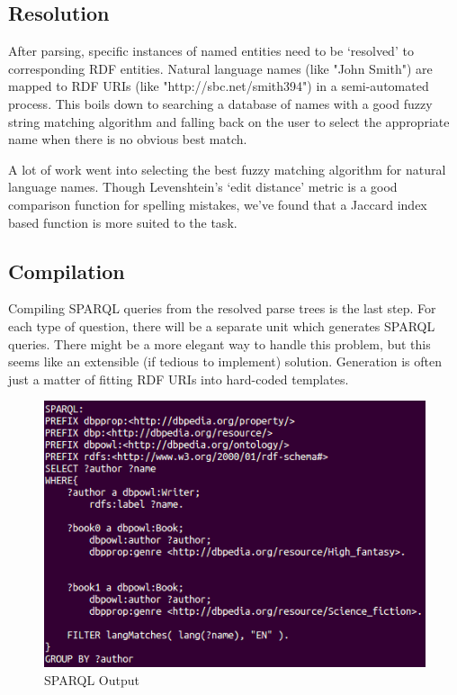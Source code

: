 \documentclass[11pt]{article}
\begin{document}
\subsection{Resolution}
After parsing, specific instances of named entities need to be `resolved' to
corresponding RDF entities. Natural language names (like "John Smith") are mapped
to RDF URIs (like "http://sbc.net/smith394")
in a semi-automated process. This boils down to searching a
database of names with a good fuzzy string matching algorithm and falling
back on the user to select the appropriate name when there is no obvious best 
match.

A lot of work went into selecting the best fuzzy matching algorithm for
natural language names. Though Levenshtein's `edit distance' metric
is a good comparison function for spelling mistakes, we've found that
a Jaccard index based function is more suited to the task. 

\subsection{Compilation}
Compiling SPARQL queries from the resolved parse trees is the last step.
For each type of question, there will be a separate unit which 
generates SPARQL queries. There might be a more elegant way to handle this
problem, but this seems like an extensible (if tedious to implement) solution.
Generation is often just a matter of fitting RDF URIs into hard-coded templates.

\begin{figure}[h!]
    \centering
    \includegraphics[width=1\textwidth,natwidth=1,natheight=1]{imgs/demo/sparql.png}
    \caption{SPARQL Output}
    \label{fig:sparql}
\end{figure}
\end{document}
